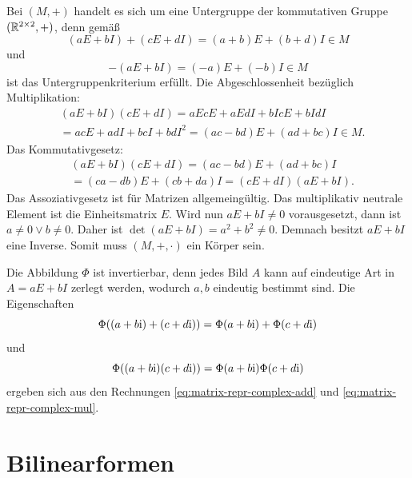 \begin{Beweis}
Bei $(M,+)$ handelt es sich um eine Untergruppe der
kommutativen Gruppe $(\mathbb R^{2\times 2},+)$, denn gemäß
\begin{equation}\label{eq:matrix-repr-complex-add}
(aE+bI)+(cE+dI) = (a+b)E+(b+d)I \in M
\end{equation}
und
\begin{equation}
-(aE+bI) = (-a)E+(-b)I\in M
\end{equation}
ist das Untergruppenkriterium erfüllt. Die Abgeschlossenheit
bezüglich Multiplikation:
\begin{equation}\label{eq:matrix-repr-complex-mul}
\begin{split}
&(aE+bI)(cE+dI) = aEcE+aEdI+bIcE+bIdI\\
&= acE+adI+bcI+bdI^2
= (ac-bd)E+(ad+bc)I \in M.
\end{split}
\end{equation}
Das Kommutativgesetz:
\begin{equation}
\begin{split}
&(aE+bI)(cE+dI) = (ac-bd)E+(ad+bc)I\\
&= (ca-db)E+(cb+da)I = (cE+dI)(aE+bI).
\end{split}
\end{equation}
Das Assoziativgesetz ist für Matrizen allgemeingültig. Das multiplikativ
neutrale Element ist die Einheitsmatrix $E$. Wird nun $aE+bI\ne 0$
vorausgesetzt, dann ist $a\ne 0\lor b\ne 0$. Daher ist
$\det(aE+bI)=a^2+b^2\ne 0$. Demnach besitzt $aE+bI$ eine Inverse.
Somit muss $(M,+,\cdot)$ ein Körper sein.

Die Abbildung $\Phi$ ist invertierbar, denn jedes Bild $A$ kann
auf eindeutige Art in $A=aE+bI$ zerlegt werden, wodurch $a,b$
eindeutig bestimmt sind. Die Eigenschaften
\begin{equation}
\Phi((a+b\mathrm i)+(c+d\mathrm i)) = \Phi(a+b\mathrm i)+\Phi(c+d\mathrm i)
\end{equation}
und
\begin{equation}
\Phi((a+b\mathrm i)(c+d\mathrm i)) = \Phi(a+b\mathrm i)\Phi(c+d\mathrm i)
\end{equation}
ergeben sich aus den Rechnungen \eqref{eq:matrix-repr-complex-add}
und \eqref{eq:matrix-repr-complex-mul}.\;\qedsymbol
\end{Beweis}

\newpage
\section{Bilinearformen}

